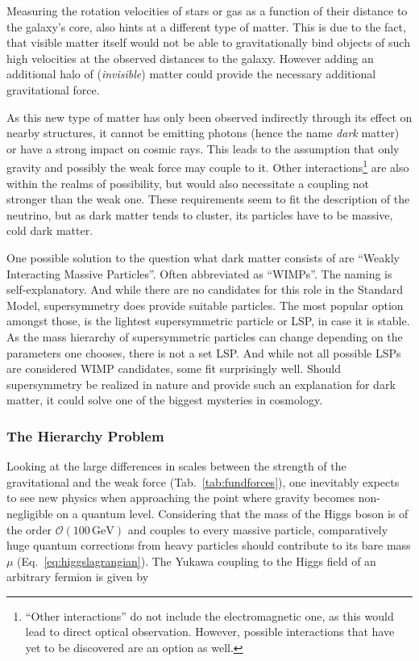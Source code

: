 \noindent Measuring the rotation velocities of stars or gas as a function of their distance to the galaxy's core, also hints at a different type of matter. This is due to the fact, that visible matter itself would not be able to gravitationally bind objects of such high velocities at the observed distances to the galaxy. However adding an additional halo of (\textit{invisible}) matter could provide the necessary additional gravitational force.

As this new type of matter has only been observed indirectly through its effect on nearby structures, it cannot be emitting photons (hence the name \textit{dark} matter) or have a strong impact on cosmic rays. This leads to the assumption that only gravity and possibly the weak force may couple to it. Other interactions\footnote{``Other interactions'' do not include the electromagnetic one, as this would lead to direct optical observation. However, possible interactions that have yet to be discovered are an option as well.} are also within the realms of possibility, but would also necessitate a coupling not stronger than the weak one. These requirements seem to fit the description of the neutrino, but as dark matter tends to cluster, its particles have to be massive, cold dark matter.

One possible solution to the question what dark matter consists of are ``Weakly Interacting Massive Particles''. Often abbreviated as ``WIMPs''. The naming is self-explanatory. And while there are no candidates for this role in the Standard Model, supersymmetry does provide suitable particles. The most popular option amongst those, is the lightest supersymmetric particle or LSP, in case it is stable. As the mass hierarchy of supersymmetric particles can change depending on the parameters one chooses, there is not a set LSP. And while not all possible LSPs are considered WIMP candidates, some fit surprisingly well. Should supersymmetry be realized in nature and provide such an explanation for dark matter, it could solve one of the biggest mysteries in cosmology.



\subsubsection{The Hierarchy Problem}
\label{sec:hierprob}
Looking at the large differences in scales between the strength of the gravitational and the weak force (Tab.~\ref{tab:fundforces}), one inevitably expects to see new physics when approaching the point where gravity becomes non-negligible on a quantum level. Considering that the mass of the Higgs boson is of the order $\mathcal{O}(100\,\text{GeV})$ and couples to every massive particle, comparatively huge quantum corrections from heavy particles should contribute to its bare mass $\mu$ (Eq.~\ref{eq:higgslagrangian}). The Yukawa coupling to the Higgs field of an arbitrary fermion is given by

